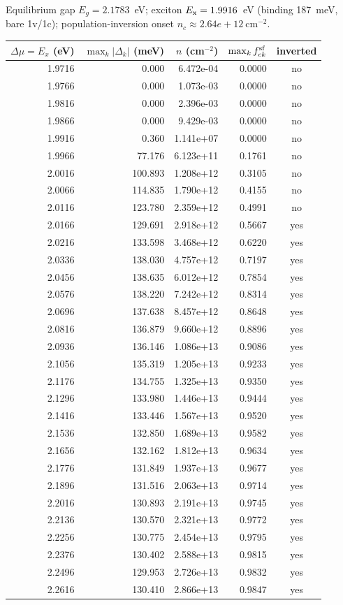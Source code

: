 Equilibrium gap $E_g=2.1783$~eV; exciton $E_{\rm x}=1.9916$~eV (binding 187~meV, bare 1v/1c); population-inversion onset $n_c\approx2.64e+12~\text{cm}^{-2}$.\\[4pt]
\begin{center}\small
\begin{tabular}{rrrrc}
\toprule
$\Delta\mu=E_x$ (eV) & $\max_k|\Delta_k|$ (meV) & $n$ (cm$^{-2}$) & $\max_k f^{\rm sf}_{ck}$ & inverted \\
\midrule
1.9716 & 0.000 & 6.472e-04 & 0.0000 & no \\
1.9766 & 0.000 & 1.073e-03 & 0.0000 & no \\
1.9816 & 0.000 & 2.396e-03 & 0.0000 & no \\
1.9866 & 0.000 & 9.429e-03 & 0.0000 & no \\
1.9916 & 0.360 & 1.141e+07 & 0.0000 & no \\
1.9966 & 77.176 & 6.123e+11 & 0.1761 & no \\
2.0016 & 100.893 & 1.208e+12 & 0.3105 & no \\
2.0066 & 114.835 & 1.790e+12 & 0.4155 & no \\
2.0116 & 123.780 & 2.359e+12 & 0.4991 & no \\
2.0166 & 129.691 & 2.918e+12 & 0.5667 & yes \\
2.0216 & 133.598 & 3.468e+12 & 0.6220 & yes \\
2.0336 & 138.030 & 4.757e+12 & 0.7197 & yes \\
2.0456 & 138.635 & 6.012e+12 & 0.7854 & yes \\
2.0576 & 138.220 & 7.242e+12 & 0.8314 & yes \\
2.0696 & 137.638 & 8.457e+12 & 0.8648 & yes \\
2.0816 & 136.879 & 9.660e+12 & 0.8896 & yes \\
2.0936 & 136.146 & 1.086e+13 & 0.9086 & yes \\
2.1056 & 135.319 & 1.205e+13 & 0.9233 & yes \\
2.1176 & 134.755 & 1.325e+13 & 0.9350 & yes \\
2.1296 & 133.980 & 1.446e+13 & 0.9444 & yes \\
2.1416 & 133.446 & 1.567e+13 & 0.9520 & yes \\
2.1536 & 132.850 & 1.689e+13 & 0.9582 & yes \\
2.1656 & 132.162 & 1.812e+13 & 0.9634 & yes \\
2.1776 & 131.849 & 1.937e+13 & 0.9677 & yes \\
2.1896 & 131.516 & 2.063e+13 & 0.9714 & yes \\
2.2016 & 130.893 & 2.191e+13 & 0.9745 & yes \\
2.2136 & 130.570 & 2.321e+13 & 0.9772 & yes \\
2.2256 & 130.775 & 2.454e+13 & 0.9795 & yes \\
2.2376 & 130.402 & 2.588e+13 & 0.9815 & yes \\
2.2496 & 129.953 & 2.726e+13 & 0.9832 & yes \\
2.2616 & 130.410 & 2.866e+13 & 0.9847 & yes \\
\bottomrule
\end{tabular}\end{center}
